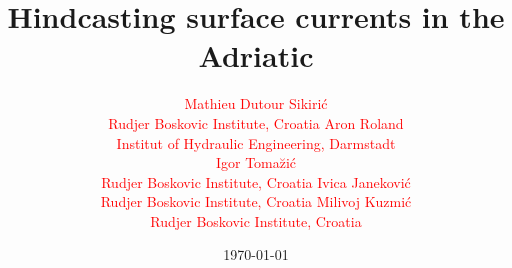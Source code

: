 \documentclass{beamer}
\begin{document}
\title{Hindcasting surface currents in the Adriatic}
\author{
{\small
\begin{center}
\textcolor{red}{\large Mathieu Dutour Sikiri\'c}\\[2mm]
\textcolor{red}{Rudjer Boskovic Institute, Croatia}
\textcolor{red}{\large Aron Roland}\\[2mm]
\textcolor{red}{Institut of Hydraulic Engineering, Darmstadt}\\[2mm]
\textcolor{red}{\large Igor Toma\u zi\'c}\\[2mm]
\textcolor{red}{Rudjer Boskovic Institute, Croatia}
\textcolor{red}{\large Ivica Janekovi\'c}\\[2mm]
\textcolor{red}{Rudjer Boskovic Institute, Croatia}
\textcolor{red}{\large Milivoj Kuzmi\'c}\\[2mm]
\textcolor{red}{Rudjer Boskovic Institute, Croatia}
\end{center}
}
}
\date{\today} 
\frame{\titlepage} 
\end{document}
